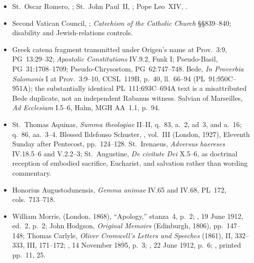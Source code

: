 {\begin{itemize}[itemsep=0em,topsep=0.15em,parsep=0pt]
, in \emph{Sermon Notes}
(1913), pp.~129--131, 188.
\item St.~Oscar Romero, ;
St.~John Paul~II, ;
Pope Leo~XIV, .
\item Second Vatican Council, ;
\emph{Catechism of the Catholic Church} §§839--840; disability and
Jewish-relations controls.
\item Greek catena fragment transmitted under Origen's name at Prov.~3:9,
PG~13:29--32; \emph{Apostolic Constitutions} IV.9.2, Funk I; Pseudo-Basil,
PG~31:1708--1709; Pseudo-Chrysostom, PG~62:747--748. Bede,
\emph{In Proverbia Salomonis} I at Prov.~3:9--10, CCSL~119B, p.~40,
ll.~66--94 (PL~91:950C--951A); the substantially identical PL~111:693C--694A
text is a misattributed Bede duplicate, not an independent Rabanus witness.
Salvian of Marseilles, \emph{Ad Ecclesiam} I.5--6, Halm, MGH AA~1.1, p.~94.
\item St.~Thomas Aquinas, \emph{Summa theologiae} II--II, q.~83, a.~2,
ad~3, and a.~16; q.~86, aa.~3--4. Blessed Ildefonso Schuster,
, vol.~III (London, 1927), Eleventh Sunday after Pentecost, pp.~124--128.
St.~Irenaeus, \emph{Adversus haereses} IV.18.5--6 and V.2.2--3;
St.~Augustine, \emph{De civitate Dei} X.5--6, as doctrinal reception of
embodied sacrifice, Eucharist, and salvation rather than wording commentary.
\item Honorius Augustodunensis, \emph{Gemma animae} IV.65 and IV.68,
PL~172, cols.~713--718.
\item William Morris, 
(London, 1868), ``Apology,'' stanza~4, p.~2;
, 19 June 1912,
ed.~2, p.~2; John Hodgson, \emph{Original Memoirs} (Edinburgh, 1806),
pp.~147--148; Thomas Carlyle, \emph{Oliver Cromwell's Letters and Speeches}
(1861), II, 332--333, III, 171--172;
, 14 November 1895, p.~3;
, 22 June 1912, p.~6;
, printed pp.~11, 25.
\end{itemize}
}
